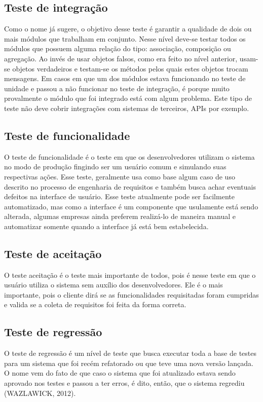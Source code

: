 \documentclass[
    12pt,       %
    openright,      %
    twoside,      %
    a4paper,      %
    english,      %
    french,       %
    spanish,      %
    brazil,       %
    ]{abntex2}
\begin{document}
          \subsection{Teste de integração}
              Como o nome já sugere, o objetivo desse teste é garantir a qualidade de dois ou mais
              módulos que trabalham em conjunto. Nesse nível deve-se testar todos os módulos que possuem
              alguma relação do tipo: associação, composição ou agregação. Ao invés de usar objetos
              falsos, como era feito no nível anterior, usam-se objetos verdadeiros e testam-se os
              métodos pelos quais estes objetos trocam mensagens. Em casos em que um dos módulos
              estava funcionando no teste de unidade e passou a não funcionar no teste de integração,
              é porque muito provalmente o módulo que foi integrado está com algum problema. Este tipo
              de teste não deve cobrir integrações com sistemas de terceiros, APIs por exemplo.

          \subsection{Teste de funcionalidade}
              O teste de funcionalidade é o teste em que os desenvolvedores utilizam o sistema no modo de
              produção fingindo ser um usuário comum e simulando suas respectivas ações. Esse teste,
              geralmente usa como base algum caso de uso descrito no processo de engenharia de
              requisitos e também busca achar eventuais defeitos na interface de usuário. Esse
              teste atualmente pode ser facilmente automatizado, mas como a interface é um componente
              que usulamente está sendo alterada, algumas empresas ainda preferem realizá-lo de maneira
              manual e automatizar somente quando a interface já está bem estabelecida.

          \subsection{Teste de aceitação}
              O teste aceitação é o teste mais importante de todos, pois é nesse teste em que o
              usuário utiliza o sistema sem auxílio dos desenvolvedores. Ele é o mais importante,
              pois o cliente dirá se as funcionalidades requisitadas foram cumpridas e valida
              se a coleta de requisitos foi feita da forma correta.

          \subsection{Teste de regressão}
              O teste de regressão é um nível de teste que busca executar toda a base de
              testes para um sistema que foi recém refatorado ou que teve uma nova versão lançada.
              O nome vem do fato de que caso o sistema que foi atualizado estava sendo aprovado
              nos testes e passou a ter erros, é dito, então, que o sistema regrediu (WAZLAWICK, 2012).
\end{document}
